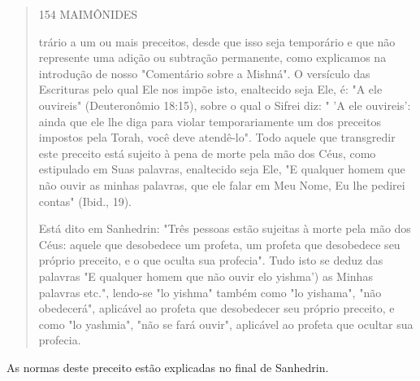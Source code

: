\begin{quote}
154 MAIMÔNIDES

trário a um ou mais preceitos, desde que isso seja temporário e que não
repre­sente uma adição ou subtração permanente, como explicamos na
introdução de nosso "Comentário sobre a Mishná". O versículo das
Escrituras pelo qual Ele nos impõe isto, enaltecido seja Ele, é: "A ele
ouvireis" (Deuteronômio 18:15), sobre o qual o Sifrei diz: " 'A ele
ouvireis': ainda que ele lhe diga para violar temporariamente um dos
preceitos impostos pela Torah, você deve atendê-lo". Todo aquele que
transgredir este preceito está sujeito à pena de morte pela mão dos
Céus, como estipulado em Suas palavras, enaltecido seja Ele, "E qualquer
homem que não ouvir as minhas palavras, que ele falar em Meu Nome, Eu
lhe pedirei contas" (Ibid., 19).

Está dito em Sanhedrin: "Três pessoas estão sujeitas à morte pela mão
dos Céus: aquele que desobedece um profeta, um profeta que desobedece
seu próprio preceito, e o que oculta sua profecia". Tudo isto se deduz
das palavras "E qualquer homem que não ouvir elo yishma') as Minhas
palavras etc.", lendo-se "lo yishma" também como "lo yishama", "não
obedecerá", aplicável ao pro­feta que desobedecer seu próprio preceito,
e como "lo yashmia", "não se fará ouvir", aplicável ao profeta que
ocultar sua profecia.
\end{quote}

As normas deste preceito estão explicadas no final de Sanhedrin.

